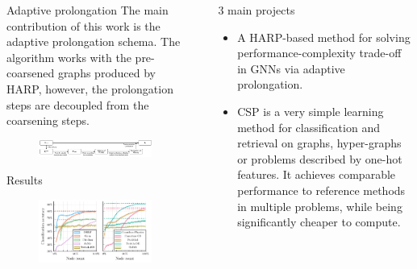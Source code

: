 \documentclass{beamer}
\newlength{\sepwidth}
\newlength{\colwidth}
\newcommand{\separatorcolumn}{\begin{column}{\sepwidth}\end{column}}
\begin{document}
\begin{frame}[fragile,t]
\begin{columns}[t]
\begin{column}{\colwidth}
		\begin{block}{Adaptive prolongation}
			The main contribution of this work is the adaptive prolongation schema. The algorithm works with the pre-coarsened graphs produced by HARP, however, the prolongation steps are decoupled from the coarsening steps.
			\begin{figure}
				\includegraphics[width=\linewidth]{images/adaptive-prolongation/adaptive-prolongation.pdf}
			\end{figure}
		\end{block}

		\begin{block}{Results}
			\begin{figure}
				\includegraphics[width = 0.95\linewidth]{images/adaptive-coarsening/adaptive-coarsening.pdf}
			\end{figure}
		\end{block}
	\end{column}

	\separatorcolumn

	\begin{column}{\colwidth}
		\begin{alertblock}{3 main projects}
			\begin{itemize}
				\item A HARP-based method for solving performance-complexity trade-off in GNNs via adaptive prolongation.
				\item CSP is a very simple learning method for classification and retrieval on graphs, hyper-graphs or problems described by one-hot features. It achieves comparable performance to reference methods in multiple problems, while being significantly cheaper to compute.
			\end{itemize}
		\end{alertblock}


\end{column}
\end{columns}
\end{frame}
\end{document}
